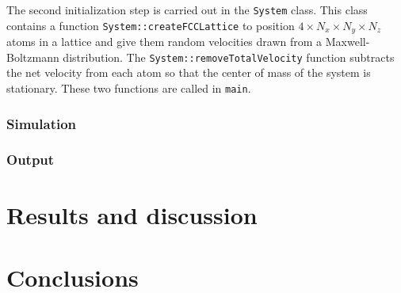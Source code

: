 \documentclass[10pt,showpacs,preprintnumbers,footinbib,amsmath,amssymb,aps,prl,twocolumn,groupedaddress,superscriptaddress,showkeys]{revtex4-1}
\begin{document}
The second initialization step is carried out in the \texttt{System}
class. This class contains a function \texttt{System::createFCCLattice}
to position $4 \times N_x \times N_y \times N_z$ atoms in a lattice and
give them random velocities drawn from a Maxwell-Boltzmann
distribution. The \texttt{System::removeTotalVelocity} function
subtracts the net velocity from each atom so that the center of mass
of the system is stationary.
These two functions are called in \texttt{main}.

\subsubsection*{Simulation}

\subsubsection*{Output}


\section{Results and discussion}








\section{Conclusions}





\end{document}
